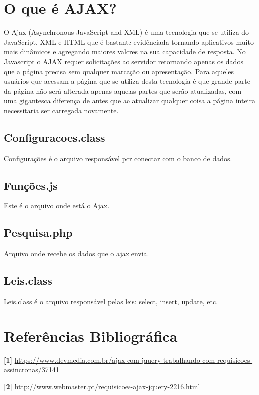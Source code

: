 \documentclass[12pt,a4paper]{article}
\begin{document}
\section{O que é AJAX?}
O Ajax (Asynchronous JavaScript and XML) é uma tecnologia que se utiliza do JavaScript, XML e HTML que é bastante evidênciada tornando aplicativos muito mais dinâmicos e agregando maiores valores na sua capacidade de resposta.
No Javascript o AJAX requer solicitações ao servidor retornando apenas os dados que a página precisa sem qualquer marcação ou apresentação. Para aqueles usuários que acessam a página que se utiliza desta tecnologia é que grande parte da página não será alterada apenas aquelas partes que serão atualizadas, com uma gigantesca diferença de antes que ao atualizar qualquer coisa a página inteira necessitaria ser carregada novamente.

\subsection{Configuracoes.class}
Configurações é o arquivo responsável por conectar com o banco de dados.


\subsection{Funções.js}
Este é o arquivo onde está o Ajax.


\subsection{Pesquisa.php}
Arquivo onde recebe os dados que o ajax envia.




\subsection{Leis.class}
Leis.class é o arquivo responsável pelas leis: select, insert, update, etc.


\section{Referências Bibliográfica}
\noindent \textbf{[1]} \url {https://www.devmedia.com.br/ajax-com-jquery-trabalhando-com-requisicoes-assincronas/37141}
\\\vspace{0.2cm}

\noindent \textbf{[2]} \url {http://www.webmaster.pt/requisicoes-ajax-jquery-2216.html}
\end{document}
